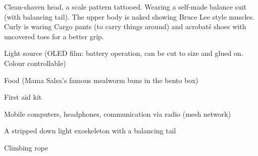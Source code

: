 \newpage
\begin{npcBox}[title=Curly continued]
    \begin{npcDescription}
    Clean-shaven head, a scale pattern tattooed. Wearing a self-made balance suit (with balancing tail).
    The upper body is naked showing Bruce Lee style muscles. Curly is waring Cargo pants (to carry things around) and acrobat\'s shoes with uncovered toes for a better grip.
    \end{npcDescription}


    \begin{equipment}
    \item Light source (OLED film: battery operation, can be cut to size and glued on. Colour controllable)
    \item Food (Mama Salsa's famous mealworm buns in the bento box)
    \item First aid kit
    \item Mobile computers, headphones, communication via radio (mesh network)
    \item A stripped down light exoskeleton with a balancing tail
    \item Climbing rope
    \end{equipment}
\end{npcBox}




